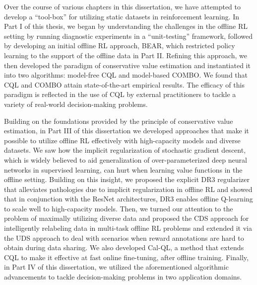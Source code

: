 \documentclass[../thesis.tex]{subfiles}
\begin{document}
Over the course of various chapters in this dissertation, we have attempted to develop a ``tool-box'' for utilizing static datasets in reinforcement learning. In Part I of this thesis, we began by understanding the challenges in the offline RL setting by running diagnostic experiments in a ``unit-testing'' framework, followed by developing an initial offline RL approach, BEAR, which restricted policy learning to the support of the offline data in Part II. Refining this approach, we then developed the paradigm of conservative value estimation and instantiated it into two algorithms: model-free CQL and model-based COMBO. We found that CQL and COMBO attain state-of-the-art empirical results. The efficacy of this paradigm is reflected in the use of CQL by external practitioners to tackle a variety of real-world decision-making problems. 

Building on the foundations provided by the principle of conservative value estimation, in Part III of this dissertation we developed approaches that make it possible to utilize offline RL effectively with high-capacity models and diverse datasets. We saw how the implicit regularization of stochastic gradient descent, which is widely believed to aid generalization of over-parameterized deep neural networks in supervised learning, can hurt when learning value functions in the offline setting. Building on this insight, we proposed the explicit DR3 regularizer that alleviates pathologies due to implicit regularization in offline RL and showed that in conjunction with the ResNet architectures, DR3 enables offline Q-learning to scale well to high-capacity models. Then, we turned our attention to the problem of maximally utilizing diverse data and proposed the CDS approach for intelligently relabeling data in multi-task offline RL problems and extended it via the UDS approach to deal with scenarios when reward annotations are hard to obtain during data sharing. We also developed Cal-QL, a method that extends CQL to make it effective at fast online fine-tuning, after offline training. Finally, in Part IV of this dissertation, we utilized the aforementioned algorithmic advancements to tackle decision-making problems in two application domains.   
\end{document}
